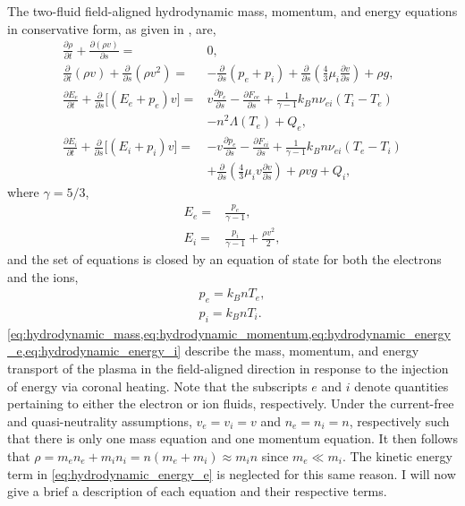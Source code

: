 The two-fluid field-aligned hydrodynamic mass, momentum, and energy equations in conservative form, as given in \citet[Appendix A]{bradshaw_influence_2013}, are,
\begin{align}
    \frac{\partial\rho}{\partial t} + \frac{\partial(\rho v)}{\partial s} =& 0, \label{eq:hydrodynamic_mass} \\
    \frac{\partial}{\partial t}(\rho v) + \frac{\partial}{\partial s}(\rho v^2) =& -\frac{\partial}{\partial s}(p_e + p_i) + \frac{\partial}{\partial s}\left(\frac{4}{3}\mu_i\frac{\partial v}{\partial s}\right) + \rho g, \label{eq:hydrodynamic_momentum} \\
    \frac{\partial E_e}{\partial t} + \frac{\partial}{\partial s} \lbrack(E_e+p_e)v\rbrack =& v\frac{\partial p_e}{\partial s} - \frac{\partial F_{ce}}{\partial s} + \frac{1}{\gamma - 1}k_Bn\nu_{ei}(T_i-T_e) \label{eq:hydrodynamic_energy_e} \\ 
    & - n^2\Lambda(T_e) + Q_{e} , \nonumber \\
    \frac{\partial E_i}{\partial t} + \frac{\partial }{\partial s}\lbrack(E_i+p_i)v\rbrack =& -v\frac{\partial p_e}{\partial s} - \frac{\partial F_{ci}}{\partial s} + \frac{1}{\gamma - 1}k_Bn\nu_{ei}(T_e-T_i) \label{eq:hydrodynamic_energy_i} \\
    & + \frac{\partial}{\partial s}\left(\frac{4}{3}\mu_iv\frac{\partial v}{\partial s}\right) +\rho vg + Q_{i}, \nonumber
\end{align}
where $\gamma=5/3$,
\begin{align}
    E_e =& \frac{p_e}{\gamma - 1} \label{eq:hydrodynamic_energy_e_def}, \\
    E_i =& \frac{p_i}{\gamma - 1} + \frac{\rho v^2}{2}, \label{eq:hydrodynamic_energy_i_def}
\end{align}
and the set of equations is closed by an equation of state for both the electrons and the ions,
\begin{align}
    p_e=k_BnT_e, \label{eq:ideal_gas_law_e}\\
    p_i=k_BnT_i \label{eq:ideal_gas_law_i}.
\end{align}
\cref{eq:hydrodynamic_mass,eq:hydrodynamic_momentum,eq:hydrodynamic_energy_e,eq:hydrodynamic_energy_i} describe the  mass, momentum, and energy transport of the plasma in the field-aligned direction in response to the injection of energy via coronal heating. Note that the subscripts $e$ and $i$ denote quantities pertaining to either the electron or ion fluids, respectively. Under the current-free and quasi-neutrality assumptions, $v_e=v_i=v$ and $n_e=n_i=n$, respectively such that there is only one mass equation and one momentum equation. It then follows that $\rho = m_en_e+m_in_i = n(m_e + m_i)\approx m_in$ since $m_e \ll m_i$. The kinetic energy term in \autoref{eq:hydrodynamic_energy_e} is neglected for this same reason. I will now give a brief a description of each equation and their respective terms.

